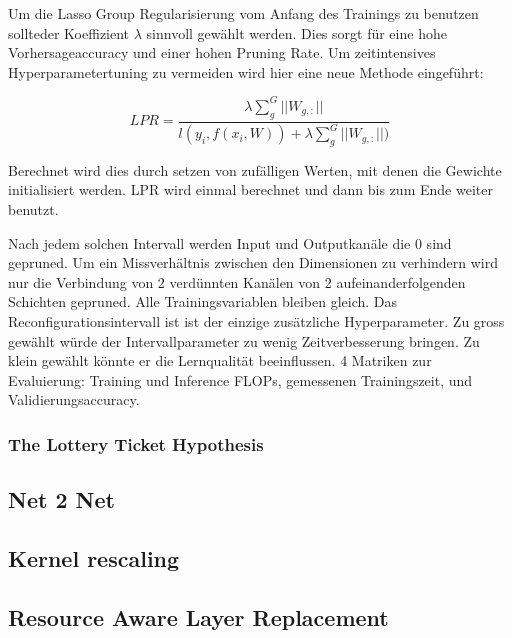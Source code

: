 Um die Lasso Group Regularisierung vom Anfang des Trainings zu benutzen sollteder Koeffizient $\lambda$ sinnvoll gewählt werden. Dies sorgt für eine hohe Vorhersageaccuracy und einer hohen Pruning Rate. Um zeitintensives Hyperparametertuning zu vermeiden wird hier eine neue Methode eingeführt:
 
 $$LPR=\frac{\lambda \sum_{g}^{G}|| W_{g,:} ||}{l(y_i,f(x_i,W))+\lambda \sum_{g}^{G}||W_{g,:} ||)} $$
 
 Berechnet wird dies durch setzen von zufälligen Werten, mit denen die Gewichte initialisiert werden. LPR wird einmal berechnet und dann bis zum Ende weiter benutzt.

 
 Nach jedem solchen Intervall werden Input und Outputkanäle die 0 sind gepruned. Um ein Missverhältnis zwischen den Dimensionen zu verhindern wird nur die Verbindung von 2 verdünnten Kanälen von 2 aufeinanderfolgenden Schichten gepruned. Alle Trainingsvariablen bleiben gleich.
 Das Reconfigurationsintervall ist ist der einzige zusätzliche Hyperparameter. Zu gross gewählt würde der Intervallparameter zu wenig Zeitverbesserung bringen. Zu klein gewählt könnte er die Lernqualität beeinflussen.
4 Matriken zur Evaluierung: Training und Inference FLOPs, gemessenen Trainingszeit, und Validierungsaccuracy. 

\subsubsection{The Lottery Ticket Hypothesis}


\subsection{Net 2 Net}


\subsection{Kernel rescaling}


\subsection{Resource Aware Layer Replacement}
